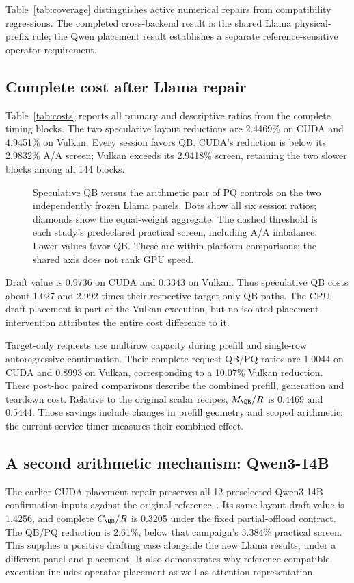 Table~\ref{tab:coverage} distinguishes active numerical repairs from compatibility regressions. The completed cross-backend result is the shared Llama physical-prefix rule; the Qwen placement result establishes a separate reference-sensitive operator requirement.

\subsection{Complete cost after Llama repair}
Table~\ref{tab:costs} reports all primary and descriptive ratios from the complete timing blocks. The two speculative layout reductions are 2.4469\% on CUDA and 4.9451\% on Vulkan. Every session favors QB. CUDA's reduction is below its 2.9832\% A/A screen; Vulkan exceeds its 2.9418\% screen, retaining the two slower blocks among all 144 blocks.



\begin{figure}[t]\centering

\caption{Speculative QB versus the arithmetic pair of PQ controls on the two independently frozen Llama panels. Dots show all six session ratios; diamonds show the equal-weight aggregate. The dashed threshold is each study's predeclared practical screen, including A/A imbalance. Lower values favor QB. These are within-platform comparisons; the shared axis does not rank GPU speed.}
\label{fig:layoutcost}
\end{figure}

Draft value is 0.9736 on CUDA and 0.3343 on Vulkan. Thus speculative QB costs about 1.027 and 2.992 times their respective target-only QB paths. The CPU-draft placement is part of the Vulkan execution, but no isolated placement intervention attributes the entire cost difference to it.

Target-only requests use multirow capacity during prefill and single-row autoregressive continuation. Their complete-request QB/PQ ratios are 1.0044 on CUDA and 0.8993 on Vulkan, corresponding to a 10.07\% Vulkan reduction. These post-hoc paired comparisons describe the combined prefill, generation and teardown cost. Relative to the original scalar recipes, $M_{\QB}/R$ is 0.4469 and 0.5444. Those savings include changes in prefill geometry and scoped arithmetic; the current service timer measures their combined effect.

\subsection{A second arithmetic mechanism: Qwen3-14B}
The earlier CUDA placement repair preserves all 12 preselected Qwen3-14B confirmation inputs against the original reference~\cite{rtxqwenrepair}. Its same-layout draft value is 1.4256, and complete $C_{\QB}/R$ is 0.3205 under the fixed partial-offload contract. The QB/PQ reduction is 2.61\%, below that campaign's 3.384\% practical screen. This supplies a positive drafting case alongside the new Llama results, under a different panel and placement. It also demonstrates why reference-compatible execution includes operator placement as well as attention representation.

